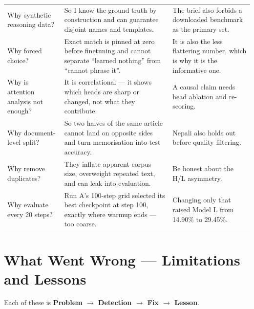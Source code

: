 \documentclass[11pt]{report}
\begin{document}
\begin{longtable}{@{}p{3.0cm}p{5.2cm}p{5.8cm}@{}}
Why synthetic reasoning data? & So I know the ground truth by construction and can guarantee disjoint names and templates. & The brief also forbids a downloaded benchmark as the primary set. \\
Why forced choice? & Exact match is pinned at zero before finetuning and cannot separate ``learned nothing'' from ``cannot phrase it''. & It is also the less flattering number, which is why it is the informative one. \\
Why is attention analysis not enough? & It is correlational --- it shows which heads are sharp or changed, not what they contribute. & A causal claim needs head ablation and re-scoring. \\
Why document-level split? & So two halves of the same article cannot land on opposite sides and turn memorisation into test accuracy. & Nepali also holds out before quality filtering. \\
Why remove duplicates? & They inflate apparent corpus size, overweight repeated text, and can leak into evaluation. & Be honest about the H/L asymmetry. \\
Why evaluate every 20 steps? & Run A's 100-step grid selected its best checkpoint at step 100, exactly where warmup ends --- too coarse. & Changing only that raised Model L from 14.90\% to 29.45\%. \\
\bottomrule
\end{longtable}

\chapter{What Went Wrong --- Limitations and Lessons}

Each of these is \textbf{Problem $\rightarrow$ Detection $\rightarrow$ Fix
$\rightarrow$ Lesson}.
\end{document}
